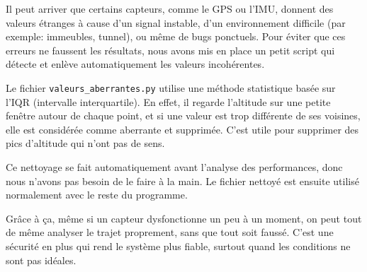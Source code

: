 Il peut arriver que certains capteurs, comme le GPS ou l’IMU, donnent des valeurs étranges à cause d’un signal instable, d’un environnement difficile (par exemple: immeubles, tunnel), ou même de bugs ponctuels. Pour éviter que ces erreurs ne faussent les résultats, nous avons mis en place un petit script qui détecte et enlève automatiquement les valeurs incohérentes.

Le fichier \texttt{valeurs\_aberrantes.py} utilise une méthode statistique basée sur l’IQR (intervalle interquartile). En effet, il regarde l’altitude sur une petite fenêtre autour de chaque point, et si une valeur est trop différente de ses voisines, elle est considérée comme aberrante et supprimée. C’est utile pour supprimer des pics d’altitude qui n’ont pas de sens.

Ce nettoyage se fait automatiquement avant l’analyse des performances, donc nous n’avons pas besoin de le faire à la main. Le fichier nettoyé est ensuite utilisé normalement avec le reste du programme.

Grâce à ça, même si un capteur dysfonctionne un peu à un moment, on peut tout de même analyser le trajet proprement, sans que tout soit faussé. C’est une sécurité en plus qui rend le système plus fiable, surtout quand les conditions ne sont pas idéales.


